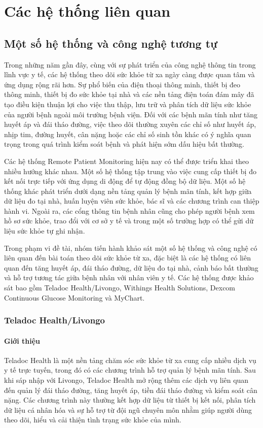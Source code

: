 \chapter{Các hệ thống liên quan}
\label{Chapter2}

\section{Một số hệ thống và công nghệ tương tự}

Trong những năm gần đây, cùng với sự phát triển của công nghệ thông tin trong lĩnh vực y tế, các hệ thống theo dõi sức khỏe từ xa ngày càng được quan tâm và ứng dụng rộng rãi hơn. Sự phổ biến của điện thoại thông minh, thiết bị đeo thông minh, thiết bị đo sức khỏe tại nhà và các nền tảng điện toán đám mây đã tạo điều kiện thuận lợi cho việc thu thập, lưu trữ và phân tích dữ liệu sức khỏe của người bệnh ngoài môi trường bệnh viện. Đối với các bệnh mãn tính như tăng huyết áp và đái tháo đường, việc theo dõi thường xuyên các chỉ số như huyết áp, nhịp tim, đường huyết, cân nặng hoặc các chỉ số sinh tồn khác có ý nghĩa quan trọng trong quá trình kiểm soát bệnh và phát hiện sớm dấu hiệu bất thường.

Các hệ thống Remote Patient Monitoring hiện nay có thể được triển khai theo nhiều hướng khác nhau. Một số hệ thống tập trung vào việc cung cấp thiết bị đo kết nối trực tiếp với ứng dụng di động để tự động đồng bộ dữ liệu. Một số hệ thống khác phát triển dưới dạng nền tảng quản lý bệnh mãn tính, kết hợp giữa dữ liệu đo tại nhà, huấn luyện viên sức khỏe, bác sĩ và các chương trình can thiệp hành vi. Ngoài ra, các cổng thông tin bệnh nhân cũng cho phép người bệnh xem hồ sơ sức khỏe, trao đổi với cơ sở y tế và trong một số trường hợp có thể gửi dữ liệu sức khỏe tự ghi nhận.

Trong phạm vi đề tài, nhóm tiến hành khảo sát một số hệ thống và công nghệ có liên quan đến bài toán theo dõi sức khỏe từ xa, đặc biệt là các hệ thống có liên quan đến tăng huyết áp, đái tháo đường, dữ liệu đo tại nhà, cảnh báo bất thường và hỗ trợ tương tác giữa bệnh nhân với nhân viên y tế. Các hệ thống được khảo sát bao gồm Teladoc Health/Livongo, Withings Health Solutions, Dexcom Continuous Glucose Monitoring và MyChart.

\subsection{Teladoc Health/Livongo}

\subsubsection{Giới thiệu}
\par Teladoc Health là một nền tảng chăm sóc sức khỏe từ xa cung cấp nhiều dịch vụ y tế trực tuyến, trong đó có các chương trình hỗ trợ quản lý bệnh mãn tính. Sau khi sáp nhập với Livongo, Teladoc Health mở rộng thêm các dịch vụ liên quan đến quản lý đái tháo đường, tăng huyết áp, tiền đái tháo đường và kiểm soát cân nặng. Các chương trình này thường kết hợp dữ liệu từ thiết bị kết nối, phân tích dữ liệu cá nhân hóa và sự hỗ trợ từ đội ngũ chuyên môn nhằm giúp người dùng theo dõi, hiểu và cải thiện tình trạng sức khỏe của mình. \cite{teladocChronicCare}

